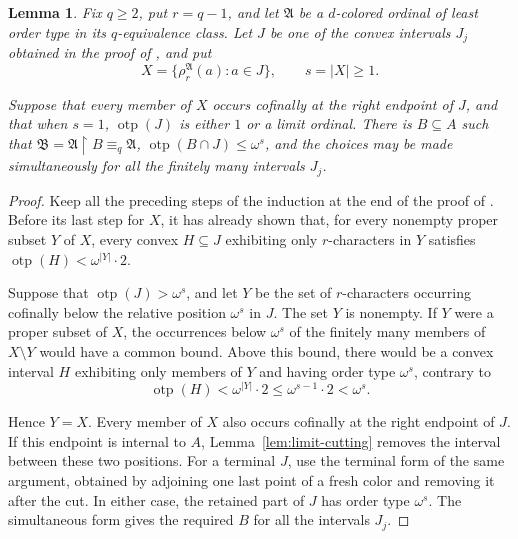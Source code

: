 \documentclass{amsart}
\newtheorem{lemma}{Lemma}
\theoremstyle{definition}
\begin{document}
\begin{lemma}\label{lem:supported-block}
    Fix $q\geq2$, put $r=q-1$, and let $\mathfrak A$ be a $d$-colored ordinal of least order type in its $q$-equivalence class. Let $J$ be one of the convex intervals $J_j$ obtained in the proof of \cite[Theorem~3.4]{Mwesigye2018}, and put
    $$X=\{\rho_r^{\mathfrak A}(a):a\in J\},\qquad s=|X|\geq1.$$
    
    Suppose that every member of $X$ occurs cofinally at the right endpoint of $J$, and that when $s=1$, $\operatorname{otp}(J)$ is either $1$ or a limit ordinal. There is $B\subseteq A$ such that $\mathfrak B=\mathfrak A\mathbin{\upharpoonright}B\equiv_q\mathfrak A$, $\operatorname{otp}(B\cap J)\leq\omega^s$, and the choices may be made simultaneously for all the finitely many intervals $J_j$.
\end{lemma}
\begin{proof}
    Keep all the preceding steps of the induction at the end of the proof of \cite[Theorem~3.4]{Mwesigye2018}. Before its last step for $X$, it has already shown that, for every nonempty proper subset $Y$ of $X$, every convex $H\subseteq J$ exhibiting only $r$-characters in $Y$ satisfies $\operatorname{otp}(H)<\omega^{|Y|}\cdot2$.
    
    Suppose that $\operatorname{otp}(J)>\omega^s$, and let $Y$ be the set of $r$-characters occurring cofinally below the relative position $\omega^s$ in $J$. The set $Y$ is nonempty. If $Y$ were a proper subset of $X$, the occurrences below $\omega^s$ of the finitely many members of $X\setminus Y$ would have a common bound. Above this bound, there would be a convex interval $H$ exhibiting only members of $Y$ and having order type $\omega^s$, contrary to
    $$\operatorname{otp}(H)<\omega^{|Y|}\cdot2\leq\omega^{s-1}\cdot2<\omega^s.$$

    Hence $Y=X$. Every member of $X$ also occurs cofinally at the right endpoint of $J$. If this endpoint is internal to $A$, Lemma~\ref{lem:limit-cutting} removes the interval between these two positions. For a terminal $J$, use the terminal form of the same argument, obtained by adjoining one last point of a fresh color and removing it after the cut. In either case, the retained part of $J$ has order type $\omega^s$. The simultaneous form gives the required $B$ for all the intervals $J_j$.
\end{proof}
\end{document}
